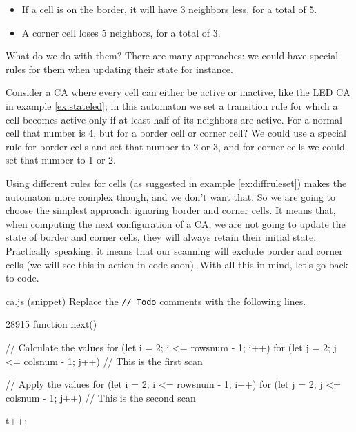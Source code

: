 \begin{itemize}
\item If a cell is on the border, it will have 3 neighbors less, for a total of 5.
\item A corner cell loses 5 neighbors, for a total of 3.
\end{itemize}

What do we do with them? There are many approaches: we could have special rules for them when updating their
state for instance.

\begin{example}
\label{ex:diffruleset}
Consider a CA where every cell can either be active or inactive, like the LED CA in
example \ref{ex:stateled}; in this automaton we set a transition rule for which 
a cell becomes active only if at least half of its neighbors are active. For a
normal cell that number is 4, but for a border cell or corner cell? We could use a special rule for border
cells and set that number to 2 or 3, and for corner cells we could set that number to 1 or 2.
\end{example}

Using different rules for cells (as suggested in example \ref{ex:diffruleset})
makes the automaton more complex though, and we don't want that.
So we are going to
choose the simplest approach: ignoring border and corner cells. It means that, when computing the next
configuration of a CA, we are not going to update the state of border and corner cells, they will always retain their initial state. Practically speaking, it means that our scanning will exclude border and corner cells
(we will see this in action in code soon). With all this in mind, let's go back to code.

\begin{programcode}{ca.js (snippet)}
Replace the \texttt{// Todo} comments with the following lines.
\begin{codeh2}{2}{8}{9}{15}
function next() {
  // Calculate the values
  for (let i = 2; i <= rowsnum - 1; i++) {
    for (let j = 2; j <= colsnum - 1; j++) {
      // This is the first scan
    }
  }

  // Apply the values
  for (let i = 2; i <= rowsnum - 1; i++) {
    for (let j = 2; j <= colsnum - 1; j++) {
      // This is the second scan
    }
  }

  t++;
}
\end{codeh2}
\end{programcode}

